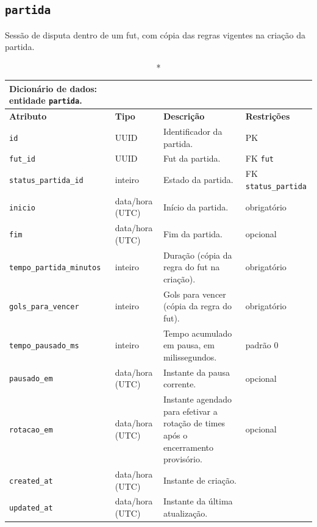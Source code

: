 \begin{apendicesenv}
    \subsection*{\texttt{partida}}
    Sessão de disputa dentro de um fut, com cópia das regras vigentes na criação da partida.
    \begin{longtable}{p{2.5cm}p{2.1cm}p{5.8cm}p{2.9cm}}
    \caption*{Dicionário de dados: entidade \texttt{partida}.}\\
        \hline
        \textbf{Atributo} & \textbf{Tipo} & \textbf{Descrição} & \textbf{Restrições} \\
        \hline
        \endhead
        \texttt{id} & UUID & Identificador da partida. & PK \\
        \texttt{fut\_id} & UUID & Fut da partida. & FK \texttt{fut} \\
        \texttt{status\_partida\_id} & inteiro & Estado da partida. & FK \texttt{status\_partida} \\
        \texttt{inicio} & data/hora (UTC) & Início da partida. & obrigatório \\
        \texttt{fim} & data/hora (UTC) & Fim da partida. & opcional \\
        \texttt{tempo\_partida\_minutos} & inteiro & Duração (cópia da regra do fut na criação). & obrigatório \\
        \texttt{gols\_para\_vencer} & inteiro & Gols para vencer (cópia da regra do fut). & obrigatório \\
        \texttt{tempo\_pausado\_ms} & inteiro & Tempo acumulado em pausa, em milissegundos. & padrão 0 \\
        \texttt{pausado\_em} & data/hora (UTC) & Instante da pausa corrente. & opcional \\
        \texttt{rotacao\_em} & data/hora (UTC) & Instante agendado para efetivar a rotação de times após o encerramento provisório. & opcional \\
        \texttt{created\_at} & data/hora (UTC) & Instante de criação. & \\
        \texttt{updated\_at} & data/hora (UTC) & Instante da última atualização. & \\
        \hline
    \end{longtable}


\end{apendicesenv}
